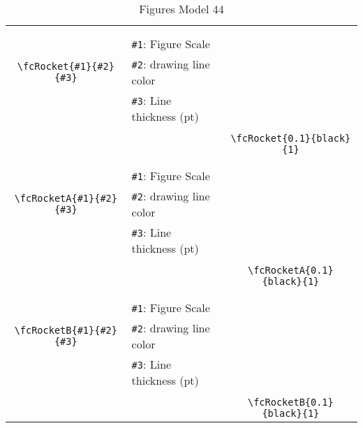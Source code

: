 \documentclass[x11names]{article}
\begin{document}
\begin{table}[H]
\begin{tabular}{|c|l|c|}
	&&\multirow{5}{*}{\fcRocket{0.1}{black}{1}}\\	&&\\	&\verb|#1|: Figure Scale &\\	\verb|\fcRocket{#1}{#2}{#3}|&	\verb|#2|: drawing line color &\\	&\verb|#3|: Line thickness (pt) &\\ &&\\&&	\verb|\fcRocket{0.1}{black}{1}|\\\hline 	
	&&\multirow{5}{*}{\fcRocketA{0.1}{black}{1}}\\	&&\\	&\verb|#1|: Figure Scale &\\	\verb|\fcRocketA{#1}{#2}{#3}|&	\verb|#2|: drawing line color &\\	&\verb|#3|: Line thickness (pt) &\\ &&\\&&	\verb|\fcRocketA{0.1}{black}{1}|\\\hline 	
	&&\multirow{5}{*}{\fcRocketB{0.1}{black}{1}}\\	&&\\	&\verb|#1|: Figure Scale &\\	\verb|\fcRocketB{#1}{#2}{#3}|&	\verb|#2|: drawing line color &\\	&\verb|#3|: Line thickness (pt) &\\ &&\\&&	\verb|\fcRocketB{0.1}{black}{1}|\\\hline 	\hline\end{tabular}\caption{Figures Model 44}\label{tab44}\end{table}
\end{document}

